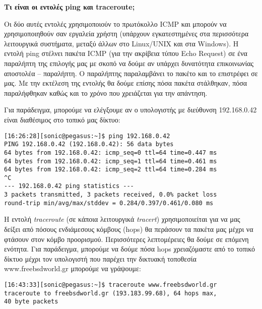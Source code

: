 \begin{inthebox}
\textbf{Τι είναι οι εντολές ping και traceroute;}

Οι δύο αυτές εντολές χρησιμοποιούν το πρωτόκολλο ICMP και μπορούν να χρησιμοποιηθούν σαν εργαλεία χρήστη (υπάρχουν εγκατεστημένες στα περισσότερα λειτουργικά συστήματα, μεταξύ άλλων στο Linux/UNIX και στα Windows). Η εντολή ping στέλνει πακέτα ICMP (για την ακρίβεια τύπου Echo Request) σε ένα παραλήπτη της επιλογής μας με σκοπό να δούμε αν υπάρχει δυνατότητα επικοινωνίας αποστολέα -- παραλήπτη. Ο παραλήπτης παραλαμβάνει το πακέτο και το επιστρέφει σε μας. Με την εκτέλεση της εντολής θα δούμε επίσης πόσα πακέτα στάλθηκαν, πόσα παραλήφθηκαν καθώς και το χρόνο που χρειάζεται για την απάντηση.

Για παράδειγμα, μπορούμε να ελέγξουμε αν ο υπολογιστής με διεύθυνση 192.168.0.42 είναι διαθέσιμος στο τοπικό μας δίκτυο:

\small
\begin{verbatim}
[16:26:28][sonic@pegasus:~]$ ping 192.168.0.42
PING 192.168.0.42 (192.168.0.42): 56 data bytes
64 bytes from 192.168.0.42: icmp_seq=0 ttl=64 time=0.447 ms
64 bytes from 192.168.0.42: icmp_seq=1 ttl=64 time=0.461 ms
64 bytes from 192.168.0.42: icmp_seq=2 ttl=64 time=0.284 ms
^C
--- 192.168.0.42 ping statistics ---
3 packets transmitted, 3 packets received, 0.0% packet loss
round-trip min/avg/max/stddev = 0.284/0.397/0.461/0.080 ms
\end{verbatim}
\normalsize

Η εντολή \emph{traceroute} (σε κάποια λειτουργικά \emph{tracert}) χρησιμοποιείται για να μας δείξει από πόσους ενδιάμεσους κόμβους (hops) θα περάσουν τα πακέτα μας μέχρι να φτάσουν στον κόμβο προορισμού. Περισσότερες λεπτομέρειες θα δούμε σε επόμενη ενότητα. Για παράδειγμα, μπορούμε να δούμε πόσα hops χρειαζόμαστε από το τοπικό δίκτυο μέχρι τον υπολογιστή που παρέχει την δικτυακή τοποθεσία www.freebsdworld.gr μπορούμε να γράψουμε:

\footnotesize
\begin{verbatim}
[16:43:33][sonic@pegasus:~]$ traceroute www.freebsdworld.gr
traceroute to freebsdworld.gr (193.183.99.68), 64 hops max, 
40 byte packets


\end{verbatim}
\end{inthebox}
